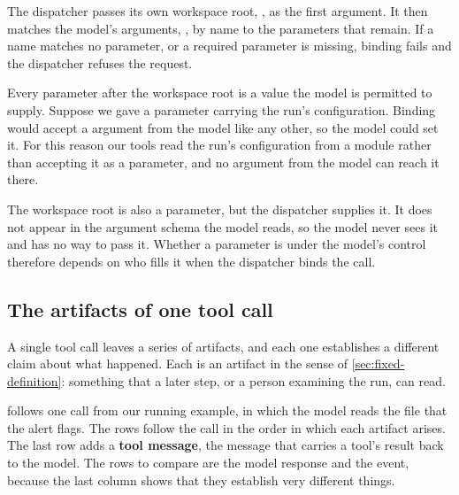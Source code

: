 The dispatcher passes its own workspace root, , as the first argument. It then
matches the model's arguments, , by name to the parameters that remain. If a name
matches no parameter, or a required parameter is missing, binding fails and the dispatcher refuses
the request.

Every parameter after the workspace root is a value the model is permitted to supply. Suppose we gave
 a  parameter carrying the run's configuration. Binding would
accept a  argument from the model like any other, so the model could set it. For
this reason our tools read the run's configuration from a module rather than accepting it as a
parameter, and no argument from the model can reach it there.

The workspace root is also a parameter, but the dispatcher supplies it. It does not appear in the
argument schema the model reads, so the model never sees it and has no way to pass it. Whether a
parameter is under the model's control therefore depends on who fills it when the dispatcher binds
the call.

\subsection{The artifacts of one tool call}
\label{sec:boundary-artifacts}

A single tool call leaves a series of artifacts, and each one establishes a different claim about
what happened. Each is an artifact in the sense of \cref{sec:fixed-definition}: something that a
later step, or a person examining the run, can read.

 follows one  call from our running example, in
which the model reads the file that the alert flags. The rows follow the call in the order in which
each artifact arises. The last row adds a \textbf{tool message}, the message that carries a tool's
result back to the model. The rows to compare are the model response and the 
event, because the last column shows that they establish very different things.

